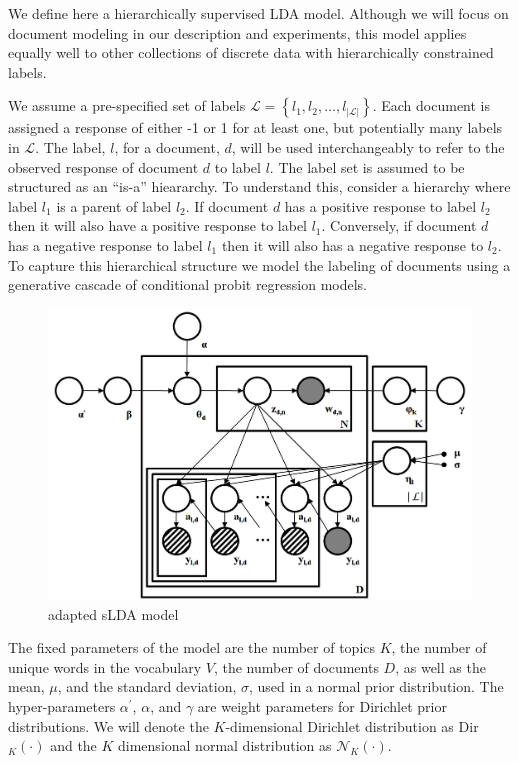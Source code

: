 
\label{sec:model} We define here a hierarchically supervised LDA
model. Although we will focus on document modeling in our description
and experiments, this model applies equally well to other collections
of discrete data with hierarchically constrained labels. 

We assume a pre-specified set of labels $\mathcal{L}=\left\{ l_{1},l_{2},\ldots,l_{\left|\mathcal{L}\right|}\right\} $.
Each document is assigned a response of either -1 or 1 for at least
one, but potentially many labels in $\mathcal{L}$. The label, $l$,
for a document, $d$, will be used interchangeably to refer to the
observed response of document $d$ to label $l$. The label set is
assumed to be structured as an {}``is-a'' hieararchy.
To understand this, consider a hierarchy where label $l_{1}$ is a
parent of label $l_{2}$. If document $d$ has a positive response
to label $l_{2}$ then it will also have a positive response to label
$l_{1}$. Conversely, if document $d$ has a negative response to
label $l_{1}$ then it will also has a negative response to $l_{2}$.
To capture this hierarchical structure we model the labeling of documents
using a generative cascade of conditional probit regression models.

%
\begin{figure}[h]
 \centering \includegraphics[scale=0.3]{Graphical_Model2} \caption{adapted sLDA model}


\label{fig:example} 
\end{figure}


The fixed parameters of the model are the number of topics $K$, the
number of unique words in the vocabulary $V$, the number of documents
$D$, as well as the mean, $\mu$, and the standard deviation, $\sigma$,
used in a normal prior distribution. The hyper-parameters $\alpha^{\prime}$,
$\alpha$, and $\gamma$ are weight parameters for Dirichlet prior
distributions. We will denote the $K$-dimensional Dirichlet distribution
as Dir$_{K}(\cdot)$ and the $K$ dimensional normal distribution
as $\mathcal{N}_{K}(\cdot)$.

